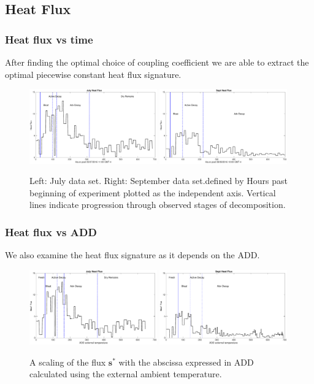\documentclass{beamer}
\begin{document}
\subsection{Heat Flux}
\begin{frame}
  \frametitle{Heat flux vs time}
After finding the optimal choice of coupling coefficient we are able
to extract the optimal piecewise constant heat flux signature.
\begin{figure}
  \includegraphics[width=0.49\textwidth]{Figures/jul_s}
  \includegraphics[width=0.49\textwidth]{Figures/sept_s_part}
  \caption{Left: July data set. Right: September data set.defined by Hours past
    beginning of experiment plotted as the independent axis. Vertical
    lines indicate progression through observed stages of decomposition.}
\end{figure}
\end{frame}

\begin{frame}
  \frametitle{Heat flux vs ADD}
  We also examine the heat flux signature as it depends on the ADD.
  \begin{figure}
\includegraphics[width=0.49\textwidth]{Figures/jul_addex}
\includegraphics[width=0.49\textwidth]{Figures/sept_addex}
\caption{A scaling of the flux $\mathbf{s}^*$ with the 
abscissa expressed in ADD calculated using the external 
ambient temperature.}
\label{fig:s-fun-ADD}
\end{figure}
\end{frame}
\end{document}
